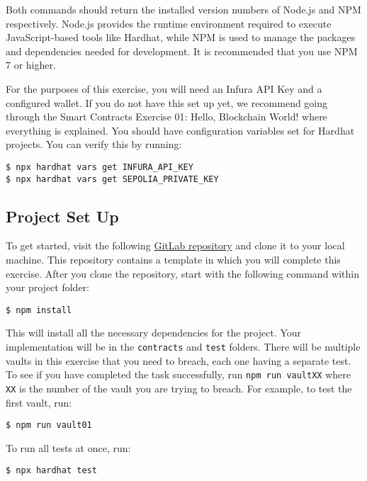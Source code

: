 \documentclass[12pt]{article}
\begin{document}
Both commands should return the installed version numbers of Node.js and NPM respectively. Node.js provides the runtime environment required to execute JavaScript-based tools like Hardhat, while NPM is used to manage the packages and dependencies needed for development. It is recommended that you use NPM 7 or higher.

For the purposes of this exercise, you will need an Infura API Key and a configured wallet. If you do not have this set up yet, we recommend going through the Smart Contracts Exercise 01: Hello, Blockchain World! where everything is explained. You should have configuration variables set for Hardhat projects. You can verify this by running:

\begin{verbatim}
$ npx hardhat vars get INFURA_API_KEY
$ npx hardhat vars get SEPOLIA_PRIVATE_KEY
\end{verbatim}



\subsection*{Project Set Up}

To get started, visit the following \href{https://gitlab.fel.cvut.cz/radovluk/smart-contracts-exercises/-/tree/main/04-Unbreakable-Vault/task/task-code}{GitLab repository} and clone it to your local machine. This repository contains a template in which you will complete this exercise. After you clone the repository, start with the following command within your project folder:

\begin{verbatim}
$ npm install
\end{verbatim}
This will install all the necessary dependencies for the project. Your implementation will be in the \texttt{contracts} and \texttt{test} folders.
There will be multiple vaults in this exercise that you need to breach, each one having a separate test. To see if you have completed the task successfully, run \texttt{npm run vaultXX} where \texttt{XX} is the number of the vault you are trying to breach. For example, to test the first vault, run:
\begin{verbatim}
$ npm run vault01
\end{verbatim}
To run all tests at once, run:
\begin{verbatim}
$ npx hardhat test
\end{verbatim}
\end{document}
